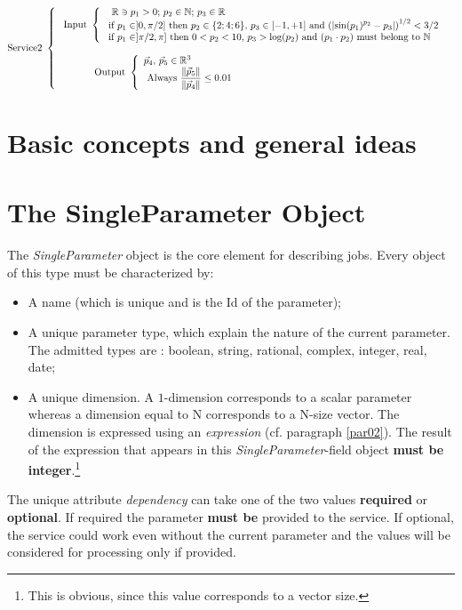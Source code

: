 \documentclass[a4paper,11pt] {article}
\begin{document}
\begin{equation}
\mbox{Service2 } \left\{
\begin{array}{l}
\ \mbox{Input } \left\{
\begin{array}{l}
\ \mbox{ $\mathbb R \ni p_1 >0$; $p_2 \in \mathbb N$; $p_3 \in \mathbb R$} \\
\ \mbox{if $p_1 \in ]0,\pi/2]$ then $p_2 \in \{2;4;6\}$, $p_3 \in [-1,+1]$ and $\displaystyle \left( \left|  \sin(p_1)^{p_2} -p_3 \right| \right)^{1/2}<3/2$ } \\
\ \mbox{if $p_1 \in ]\pi/2,\pi]$ then $0<p_2 < 10$, $p_3>\log(p_2)$ and $(p_1 \cdot p_2)$ must belong to $\mathbb N$} \\
\end{array}
\right. \\
\\
\ \mbox{\hspace{1cm} Output } \left\{
\begin{array}{l}
 \mbox{$\vec p_4, \, \vec p_5 \in \mathbb R^3$ } \\
 \ \mbox{Always $\displaystyle \frac{\| \vec p_5\|}{\|\vec p_4 \|} \leq 0.01 $} \\
 \end{array}
\right.\\
\end{array}
\right.
\end{equation}


\section{Basic concepts and general ideas}


\section{The SingleParameter Object}\label{par01}
The {\it SingleParameter} object is the core element for describing jobs. 
Every object of this type must be characterized by:
\begin{itemize}
\item A name (which is unique and is the Id of the parameter);
\item A unique parameter type, which explain the nature of the current parameter. The admitted types are : boolean, string, rational, complex, integer, real, date;
\item A unique dimension. A $1$-dimension corresponds to a scalar parameter whereas a dimension equal to N corresponds to a N-size vector. The dimension is expressed using an {\it expression} (cf. paragraph \ref{par02}). The result of the expression that appears in this {\it SingleParameter}-field object {\bf must be integer}.\footnote{This is obvious, since this value corresponds to a vector size.} 
\end{itemize}
The unique attribute {\it dependency} can take one of the two values {\bf required} or {\bf optional}. If required the parameter {\bf must be} provided to the service. If optional, the service could work even without the current parameter and the values will be considered for processing only if provided.\\
\end{document}
